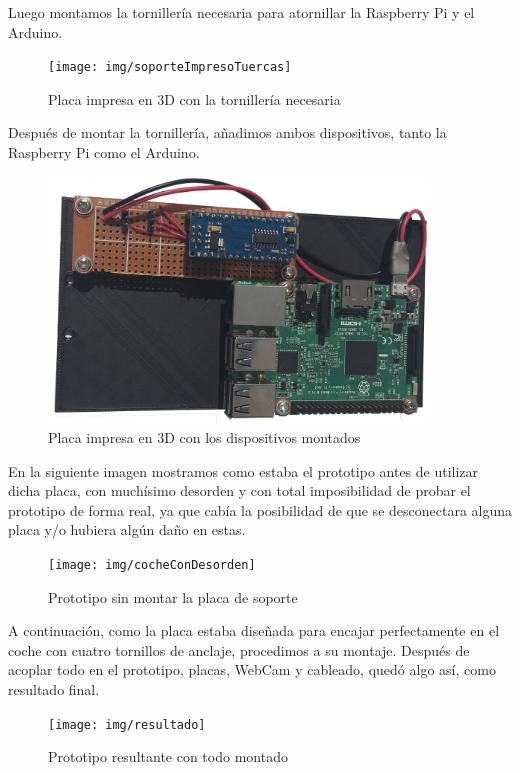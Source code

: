 \documentclass{pclass}
\begin{document}
\begin{itemize}
Luego montamos la tornillería necesaria para atornillar la Raspberry Pi y el Arduino.

\begin{figure}[H]
	\centering
	\texttt{[image: img/soporteImpresoTuercas]}
	\caption{Placa impresa en 3D con la tornillería necesaria}
	\label{fig:soporteplacasimpresotuercas}
\end{figure}

Después de montar la tornillería, añadimos ambos dispositivos, tanto la Raspberry Pi como el Arduino.

\begin{figure}[H]
	\centering
	\includegraphics[width=0.9\textwidth]{img/soporteConPlacas}
	\caption{Placa impresa en 3D con los dispositivos montados}
	\label{fig:soporteconplacas}
\end{figure}

En la siguiente imagen mostramos como estaba el prototipo antes de utilizar dicha placa, con muchísimo desorden y con total imposibilidad de probar el prototipo de forma real, ya que cabía la posibilidad de que se desconectara alguna placa y/o hubiera algún daño en estas.

\begin{figure}[H]
	\centering
	\texttt{[image: img/cocheConDesorden]}
	\caption{Prototipo sin montar la placa de soporte}
	\label{fig:cochesinsoporte}
\end{figure}

A continuación, como la placa estaba diseñada para encajar perfectamente en el coche con cuatro tornillos de anclaje, procedimos a su montaje. Después de acoplar todo en el prototipo, placas, WebCam y cableado, quedó algo así, como resultado final.

\begin{figure}[H]
	\centering
	\texttt{[image: img/resultado]}
	\caption{Prototipo resultante con todo montado}
	\label{fig:cochesResultante}
\end{figure}


\end{itemize}
\end{document}
